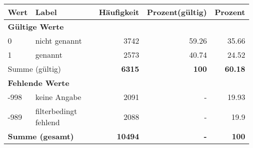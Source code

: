      \begin{longtable}{lXrrr}
     \toprule
     \textbf{Wert} & \textbf{Label} & \textbf{Häufigkeit} & \textbf{Prozent(gültig)} & \textbf{Prozent} \\
     \endhead
     \midrule
     \multicolumn{5}{l}{\textbf{Gültige Werte}}\\

     0 &
     \multicolumn{1}{X}{ nicht genannt   } &


       \num{3742} &
       \num[round-mode=places,round-precision=2]{59,26} &
         \num[round-mode=places,round-precision=2]{35,66} \\

     1 &
     \multicolumn{1}{X}{ genannt   } &


       \num{2573} &
       \num[round-mode=places,round-precision=2]{40,74} &
         \num[round-mode=places,round-precision=2]{24,52} \\
     \midrule
     \multicolumn{2}{l}{Summe (gültig)} &
       \textbf{\num{6315}} &
     \textbf{100} &
       \textbf{\num[round-mode=places,round-precision=2]{60,18}} \\
     \multicolumn{5}{l}{\textbf{Fehlende Werte}}\\
       -998 &
       keine Angabe &
         \num{2091} &
        - &
         \num[round-mode=places,round-precision=2]{19,93} \\
       -989 &
       filterbedingt fehlend &
         \num{2088} &
        - &
         \num[round-mode=places,round-precision=2]{19,9} \\
     \midrule
     \multicolumn{2}{l}{\textbf{Summe (gesamt)}} &
          \textbf{\num{10494}} &
        \textbf{-} &
        \textbf{100} \\
     \bottomrule
     \end{longtable}
     
